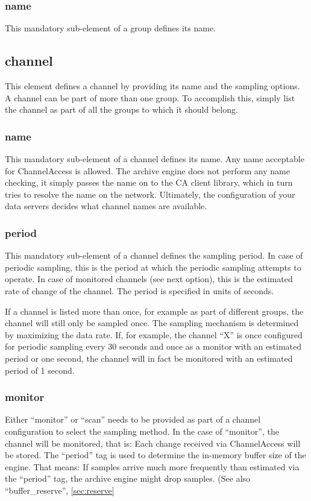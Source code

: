 \subsubsection{name}
This mandatory sub-element of a group defines its name.

\subsection{channel}
This element defines a channel by providing its name and the sampling
options. A channel can be part of more than one group. To accomplish
this, simply list the channel as part of all the groups to which it
should belong.

\subsubsection{name}
This mandatory sub-element of a channel defines its name. Any name
acceptable for ChannelAccess is allowed. The archive engine does not
perform any name checking, it simply passes the name on to the CA
client library, which in turn tries to resolve the name on the
network.  Ultimately, the configuration of your data servers decides
what channel names are available.

\subsubsection{period} \label{sec:period}
This mandatory sub-element of a channel defines the sampling period.
In case of periodic sampling, this is the period at which the periodic
sampling attempts to operate. In case of monitored channels (see next
option), this is the estimated rate of change of the channel.
The period is specified in units of seconds.

If a channel is listed more than once, for example as part of
different groups, the channel will still only be sampled once. The
sampling mechanism is determined by maximizing the data rate. If, for
example, the channel ``X'' is once configured for periodic sampling
every 30 seconds and once as a monitor with an estimated period or one
second, the channel will in fact be monitored with an estimated period
of 1 second.

\subsubsection{monitor}
Either ``monitor'' or ``scan'' needs to be provided as part of a
channel configuration to select the sampling method.  In the case of
``monitor'', the channel will be monitored, that is: Each change
received via ChannelAccess will be stored. The ``period'' tag is used
to determine the in-memory buffer size of the engine. That means: If
samples arrive much more frequently than estimated via the ``period''
tag, the archive engine might drop samples. (See also
``buffer\_reserve'', \ref{sec:reserve}


